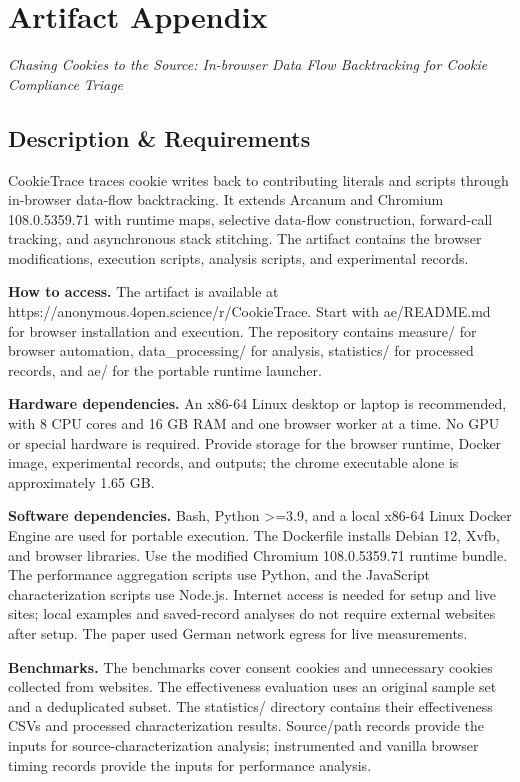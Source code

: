 \documentclass[conference]{IEEEtran}
\begin{document}
\appendices
\section{Artifact Appendix}
\textit{Chasing Cookies to the Source: In-browser Data Flow Backtracking for Cookie Compliance Triage}

\subsection{Description \& Requirements}
CookieTrace traces cookie writes back to contributing literals and scripts through in-browser data-flow backtracking. It extends Arcanum and Chromium 108.0.5359.71 with runtime maps, selective data-flow construction, forward-call tracking, and asynchronous stack stitching. The artifact contains the browser modifications, execution scripts, analysis scripts, and experimental records.

\noindent\textbf{How to access.} The artifact is available at https://anonymous.4open.science/r/CookieTrace. Start with ae/README.md for browser installation and execution. The repository contains measure/ for browser automation, data\_processing/ for analysis, statistics/ for processed records, and ae/ for the portable runtime launcher.

\noindent\textbf{Hardware dependencies.} An x86-64 Linux desktop or laptop is recommended, with 8 CPU cores and 16 GB RAM and one browser worker at a time. No GPU or special hardware is required. Provide storage for the browser runtime, Docker image, experimental records, and outputs; the chrome executable alone is approximately 1.65 GB.

\noindent\textbf{Software dependencies.} Bash, Python >=3.9, and a local x86-64 Linux Docker Engine are used for portable execution. The Dockerfile installs Debian 12, Xvfb, and browser libraries. Use the modified Chromium 108.0.5359.71 runtime bundle. The performance aggregation scripts use Python, and the JavaScript characterization scripts use Node.js. Internet access is needed for setup and live sites; local examples and saved-record analyses do not require external websites after setup. The paper used German network egress for live measurements.

\noindent\textbf{Benchmarks.} The benchmarks cover consent cookies and unnecessary cookies collected from websites. The effectiveness evaluation uses an original sample set and a deduplicated subset. The statistics/ directory contains their effectiveness CSVs and processed characterization results. Source/path records provide the inputs for source-characterization analysis; instrumented and vanilla browser timing records provide the inputs for performance analysis.
\end{document}
